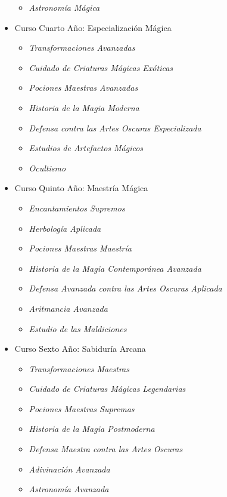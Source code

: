 \begin{itemize}
\begin{itemize}
      \item \textit{Astronomía Mágica}
    \end{itemize}
  \item Curso Cuarto Año: Especialización Mágica
    \begin{itemize}
      \item \textit{Transformaciones Avanzadas}
      \item \textit{Cuidado de Criaturas Mágicas Exóticas}
      \item \textit{Pociones Maestras Avanzadas}
      \item \textit{Historia de la Magia Moderna}
      \item \textit{Defensa contra las Artes Oscuras Especializada}
      \item \textit{Estudios de Artefactos Mágicos}
      \item \textit{Ocultismo}
    \end{itemize}
  \item Curso Quinto Año: Maestría Mágica
    \begin{itemize}
      \item \textit{Encantamientos Supremos}
      \item \textit{Herbología Aplicada}
      \item \textit{Pociones Maestras Maestría}
      \item \textit{Historia de la Magia Contemporánea Avanzada}
      \item \textit{Defensa Avanzada contra las Artes Oscuras Aplicada}
      \item \textit{Aritmancia Avanzada}
      \item \textit{Estudio de las Maldiciones}
    \end{itemize}
  \item Curso Sexto Año: Sabiduría Arcana
    \begin{itemize}
      \item \textit{Transformaciones Maestras}
      \item \textit{Cuidado de Criaturas Mágicas Legendarias}
      \item \textit{Pociones Maestras Supremas}
      \item \textit{Historia de la Magia Postmoderna}
      \item \textit{Defensa Maestra contra las Artes Oscuras}
      \item \textit{Adivinación Avanzada}
      \item \textit{Astronomía Avanzada}
    \end{itemize}
\end{itemize}

